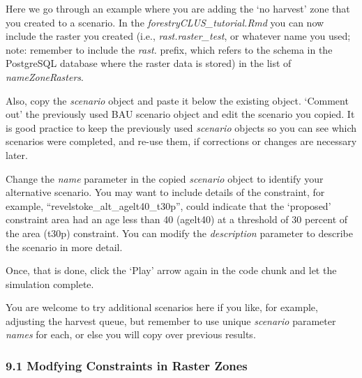 \documentclass[
]{article}
\begin{document}
Here we go through an example where you are adding the `no harvest' zone
that you created to a scenario. In the \emph{forestryCLUS\_tutorial.Rmd}
you can now include the raster you created (i.e.,
\emph{rast.raster\_test}, or whatever name you used; note: remember to
include the \emph{rast.} prefix, which refers to the schema in the
PostgreSQL database where the raster data is stored) in the list of
\emph{nameZoneRasters}.

Also, copy the \emph{scenario} object and paste it below the existing
object. `Comment out' the previously used BAU scenario object and edit
the scenario you copied. It is good practice to keep the previously used
\emph{scenario} objects so you can see which scenarios were completed,
and re-use them, if corrections or changes are necessary later.

Change the \emph{name} parameter in the copied \emph{scenario} object to
identify your alternative scenario. You may want to include details of
the constraint, for example, ``revelstoke\_alt\_agelt40\_t30p'', could
indicate that the `proposed' constraint area had an age less than 40
(agelt40) at a threshold of 30 percent of the area (t30p) constraint.
You can modify the \emph{description} parameter to describe the scenario
in more detail.

Once, that is done, click the `Play' arrow again in the code chunk and
let the simulation complete.

You are welcome to try additional scenarios here if you like, for
example, adjusting the harvest queue, but remember to use unique
\emph{scenario} parameter \emph{names} for each, or else you will copy
over previous results.

\hypertarget{modfying-constraints-in-raster-zones}{%
\subsubsection{9.1 Modfying Constraints in Raster
Zones}\label{modfying-constraints-in-raster-zones}}
\end{document}
